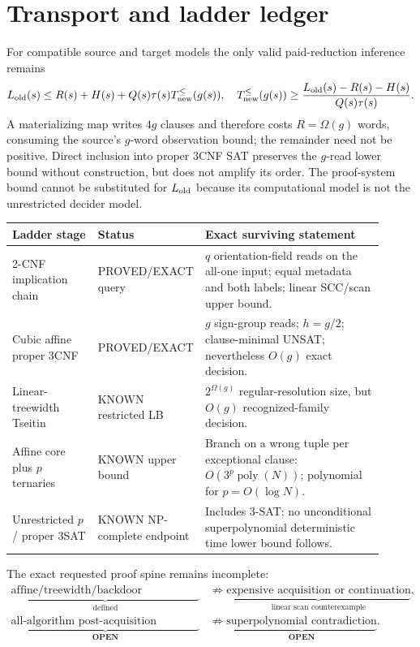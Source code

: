 \documentclass[11pt]{article}
\begin{document}
\section{Transport and ladder ledger}
For compatible source and target models the only valid paid-reduction inference remains
\[
L_{\rm old}(s)\le R(s)+H(s)+Q(s)\tau(s)T_{\rm new}^{\le}(g(s)),
\quad
T_{\rm new}^{\le}(g(s))\ge
\frac{L_{\rm old}(s)-R(s)-H(s)}{Q(s)\tau(s)}.
\]
A materializing map writes $4g$ clauses and therefore costs $R=\Omega(g)$ words, consuming the source's $g$-word observation bound; the remainder need not be positive. Direct inclusion into proper 3CNF SAT preserves the $g$-read lower bound without construction, but does not amplify its order. The proof-system bound cannot be substituted for $L_{\rm old}$ because its computational model is not the unrestricted decider model.

\begin{center}\small
\begin{tabular}{p{0.23\linewidth}p{0.20\linewidth}p{0.48\linewidth}}
\toprule
Ladder stage & Status & Exact surviving statement\\
\midrule
2-CNF implication chain & PROVED/EXACT query & $q$ orientation-field reads on the all-one input; equal metadata and both labels; linear SCC/scan upper bound.\\
Cubic affine proper 3CNF & PROVED/EXACT & $g$ sign-group reads; $h=g/2$; clause-minimal UNSAT; nevertheless $O(g)$ exact decision.\\
Linear-treewidth Tseitin & KNOWN restricted LB & $2^{\Omega(g)}$ regular-resolution size, but $O(g)$ recognized-family decision.\\
Affine core plus $p$ ternaries & KNOWN upper bound & Branch on a wrong tuple per exceptional clause: $O(3^p\operatorname{poly}(N))$; polynomial for $p=O(\log N)$.\\
Unrestricted $p$ / proper 3SAT & KNOWN NP-complete endpoint & Includes 3-SAT; no unconditional superpolynomial deterministic time lower bound follows.\\
\bottomrule
\end{tabular}
\end{center}

The exact requested proof spine remains incomplete:
\begin{align*}
\underbrace{\text{affine/treewidth/backdoor obstruction}}_{\text{defined}}
&\not\Rightarrow
\underbrace{\text{expensive acquisition or continuation}}_{\text{linear scan counterexample}},\\
\underbrace{\text{all-algorithm post-acquisition coverage}}_{\textbf{OPEN}}
&\not\Rightarrow
\underbrace{\text{superpolynomial contradiction}}_{\textbf{OPEN}}.
\end{align*}
\end{document}
